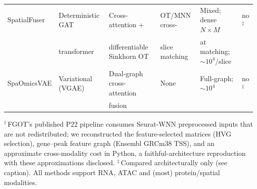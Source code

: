 \begin{table}[ht]
\begin{tabular}{@{}llllll@{}}
SpatialFuser & Deterministic GAT & Cross-attention + & OT/MNN cross- & Mixed; dense $N{\times}M$ & no$^{\ddagger}$ \\
 & transformer & differentiable Sinkhorn OT & slice matching & at matching; $\sim$$10^4$/slice & \\
SpaOmicsVAE & Variational (VGAE) & Dual-graph cross-attention & None & Full-graph; $\sim$$10^4$ & no$^{\ddagger}$ \\
 & & fusion & & & \\
\bottomrule
\end{tabular}
\par\vspace{2pt}
\footnotesize\raggedright
$^{\dagger}$\,FGOT's published P22 pipeline consumes Seurat-WNN preprocessed inputs that are not redistributed; we reconstructed the feature-selected matrices (HVG selection), gene--peak feature graph (Ensembl GRCm38 TSS), and an approximate cross-modality cost in Python, a faithful-architecture reproduction with these approximations disclosed. $^{\ddagger}$\,Compared architecturally only (see caption). All methods support RNA, ATAC and (most) protein/spatial modalities.
\end{table}
